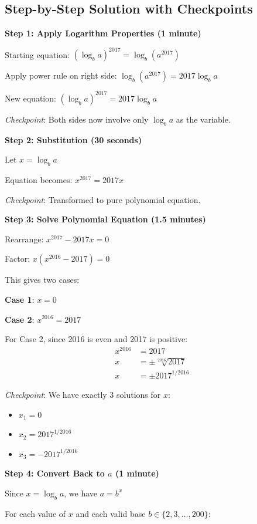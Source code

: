 \documentclass[]{article}
\begin{document}
\begin{solutionbox}
\subsection*{Step-by-Step Solution with Checkpoints}

\textbf{Step 1: Apply Logarithm Properties (1 minute)}

Starting equation: $(\log_b a)^{2017}=\log_b(a^{2017})$

Apply power rule on right side: $\log_b(a^{2017}) = 2017\log_b a$

New equation: $(\log_b a)^{2017} = 2017\log_b a$

\textit{Checkpoint}: Both sides now involve only $\log_b a$ as the variable.

\textbf{Step 2: Substitution (30 seconds)}

Let $x = \log_b a$

Equation becomes: $x^{2017} = 2017x$

\textit{Checkpoint}: Transformed to pure polynomial equation.

\textbf{Step 3: Solve Polynomial Equation (1.5 minutes)}

Rearrange: $x^{2017} - 2017x = 0$

Factor: $x(x^{2016} - 2017) = 0$

This gives two cases:

\textbf{Case 1}: $x = 0$

\textbf{Case 2}: $x^{2016} = 2017$

For Case 2, since 2016 is even and 2017 is positive:
\begin{align*}
x^{2016} &= 2017\\
x &= \pm\sqrt[2016]{2017}\\
x &= \pm 2017^{1/2016}
\end{align*}

\textit{Checkpoint}: We have exactly 3 solutions for $x$:
\begin{itemize}
    \item $x_1 = 0$
    \item $x_2 = 2017^{1/2016}$
    \item $x_3 = -2017^{1/2016}$
\end{itemize}

\textbf{Step 4: Convert Back to $a$ (1 minute)}

Since $x = \log_b a$, we have $a = b^x$

For each value of $x$ and each valid base $b \in \{2, 3, \ldots, 200\}$:


\end{solutionbox}
\end{document}
